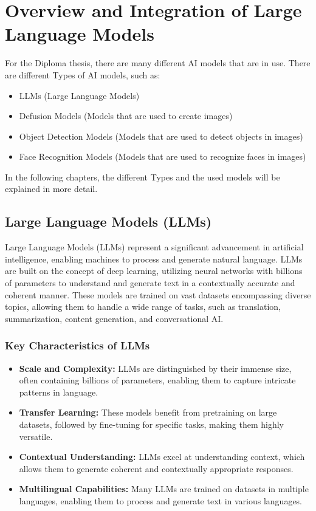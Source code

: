 \chapter{Overview and Integration of Large Language Models}
\label{cha:Introduction_to_the_used_Large_Language_Models}

For the Diploma thesis, there are many different AI models that are in use. There are different Types of AI models, such as:
\begin{itemize}
    \item LLMs (Large Language Models)
    \item Defusion Models (Models that are used to create images)
    \item Object Detection Models (Models that are used to detect objects in images)
    \item Face Recognition Models (Models that are used to recognize faces in images)
\end{itemize}

In the following chapters, the different Types and the used models will be explained in more detail.

\section{Large Language Models (LLMs)}

Large Language Models (LLMs) represent a significant advancement in artificial intelligence, enabling machines to process and generate natural language. 
LLMs are built on the concept of deep learning, utilizing neural networks with billions of parameters to understand and generate text in a contextually accurate 
and coherent manner. These models are trained on vast datasets encompassing diverse topics, allowing them to handle a wide range of tasks, such as translation, 
summarization, content generation, and conversational AI.

\subsection{Key Characteristics of LLMs}

\begin{itemize}
\item \textbf{Scale and Complexity:} LLMs are distinguished by their immense size, often containing billions of parameters, enabling them to capture intricate patterns in language.
\item \textbf{Transfer Learning:} These models benefit from pretraining on large datasets, followed by fine-tuning for specific tasks, making them highly versatile.
\item \textbf{Contextual Understanding:} LLMs excel at understanding context, which allows them to generate coherent and contextually appropriate responses.
\item \textbf{Multilingual Capabilities:} Many LLMs are trained on datasets in multiple languages, enabling them to process and generate text in various languages.
\end{itemize}

